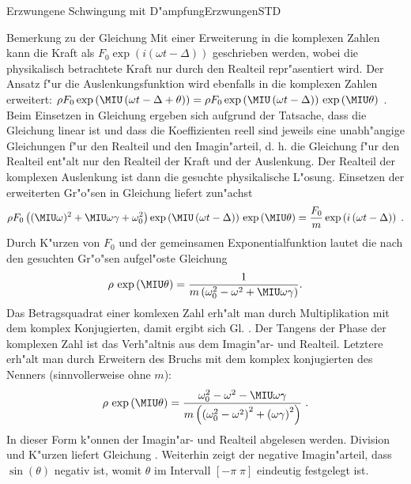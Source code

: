 \begin{MXContent}{Erzwungene Schwingung mit D"ampfung}{Erzwungen}{STD}
    \begin{MHint}{Bemerkung zu der Gleichung}
    Mit einer Erweiterung in die komplexen Zahlen kann die Kraft als $F_0\exp\left(i\left(\omega t - \Delta\right)\right)$ geschrieben werden, wobei die physikalisch betrachtete Kraft nur durch den Realteil repr"asentiert wird. Der Ansatz f"ur die Auslenkungsfunktion wird ebenfalls in die komplexen Zahlen erweitert: $\rho F_0 \exp\left(\MIU\left(\omega t - \Delta + \theta \right)\right) = \rho F_0 \exp\left(\MIU\left(\omega t - \Delta \right)\right) \, \exp\left(\MIU \theta \right)$ . Beim Einsetzen in Gleichung  ergeben sich aufgrund der Tatsache, dass die Gleichung linear ist und dass die Koeffizienten reell sind jeweils eine unabh"angige Gleichungen f"ur den Realteil und den Imagin"arteil, d. h. die Gleichung f"ur den Realteil ent"alt nur den Realteil der Kraft und der Auslenkung. Der Realteil der komplexen Auslenkung ist dann die gesuchte physikalische L"osung. Einsetzen der erweiterten Gr"o"sen in Gleichung  liefert zun"achst
    \begin{displaymath}
        \rho F_0 \left( (\MIU\omega)^2 + \MIU\omega\gamma + \omega_0^2 \right) \exp\left(\MIU\left(\omega t - \Delta \right)\right) \, \exp\left(\MIU \theta \right)
            = \frac{F_0}{m} \exp\left(i\left(\omega t - \Delta\right)\right)\; .
    \end{displaymath}
    Durch K"urzen von $F_0$ und der gemeinsamen Exponentialfunktion lautet die nach den gesuchten Gr"o"sen aufgel"oste Gleichung 
    \begin{displaymath}
        \rho  \, \exp\left(\MIU \theta \right) = \frac{1}{m\left( \omega_0^2 - \omega^2 + \MIU\omega\gamma \right)}  .
    \end{displaymath}
    Das Betragsquadrat einer komlexen Zahl erh"alt man durch Multiplikation mit dem komplex Konjugierten, damit ergibt sich Gl. . 
    Der Tangens der Phase der komplexen Zahl ist das Verh"altnis aus dem Imagin"ar- und Realteil. Letztere erh"alt man durch Erweitern des Bruchs mit dem komplex konjugierten des Nenners (sinnvollerweise ohne $m$):
    \begin{displaymath}
        \rho  \, \exp\left(\MIU \theta \right) = \frac{ \omega_0^2 - \omega^2 - \MIU\omega\gamma }
						      {m\left(\left(\omega_0^2 - \omega^2\right)^2 + \left(\omega\gamma\right)^2\right)}  \;.
    \end{displaymath}
    In dieser Form k"onnen der Imagin"ar- und Realteil abgelesen werden. Division und K"urzen liefert Gleichung . Weiterhin zeigt der negative Imagin"arteil, dass $\sin(\theta)$ negativ ist, womit $\theta$ im Intervall $[-\pi\; \pi]$ eindeutig festgelegt ist.
    \end{MHint}


\end{MXContent}

